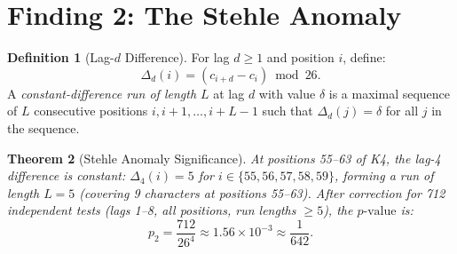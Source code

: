 \documentclass[11pt]{article}
\theoremstyle{plain}
\newtheorem{theorem}{Theorem}[section]
\theoremstyle{definition}
\newtheorem{definition}[theorem]{Definition}
\theoremstyle{remark}
\newcommand{\pvalue}{p\text{-value}}
\begin{document}
\section{Finding 2: The Stehle Anomaly}
\label{sec:stehle}

\begin{definition}[Lag-$d$ Difference]
For lag $d \geq 1$ and position $i$, define:
\begin{equation}
\Delta_d(i) = (c_{i+d} - c_i) \bmod 26.
\end{equation}
A \emph{constant-difference run of length $L$} at lag $d$ with value $\delta$ is a maximal sequence of $L$ consecutive positions $i, i{+}1, \ldots, i{+}L{-}1$ such that $\Delta_d(j) = \delta$ for all $j$ in the sequence.
\end{definition}

\begin{theorem}[Stehle Anomaly Significance]
\label{thm:stehle}
At positions 55--63 of K4, the lag-4 difference is constant: $\Delta_4(i) = 5$ for $i \in \{55,56,57,58,59\}$, forming a run of length $L=5$ (covering 9 characters at positions 55--63). After correction for 712 independent tests (lags 1--8, all positions, run lengths $\geq 5$), the $\pvalue$ is:
\begin{equation}
p_2 = \frac{712}{26^4} \approx 1.56 \times 10^{-3} \approx \frac{1}{642}.
\label{eq:stehle-p}
\end{equation}
\end{theorem}
\end{document}
